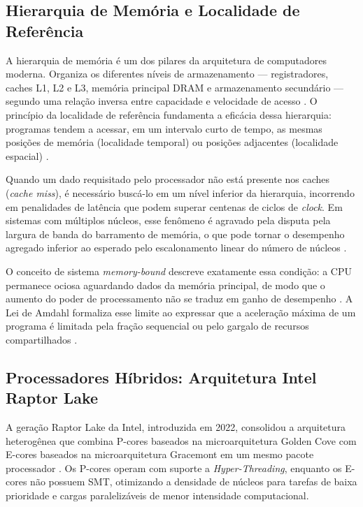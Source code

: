 \documentclass[12pt]{article}
\begin{document}
\subsection{Hierarquia de Memória e Localidade de Referência}

A hierarquia de memória é um dos pilares da arquitetura de computadores moderna. Organiza os diferentes níveis de armazenamento --- registradores, caches L1, L2 e L3, memória principal DRAM e armazenamento secundário --- segundo uma relação inversa entre capacidade e velocidade de acesso \cite{patterson2021}. O princípio da localidade de referência fundamenta a eficácia dessa hierarquia: programas tendem a acessar, em um intervalo curto de tempo, as mesmas posições de memória (localidade temporal) ou posições adjacentes (localidade espacial) \cite{hennessy2017}.

Quando um dado requisitado pelo processador não está presente nos caches (\textit{cache miss}), é necessário buscá-lo em um nível inferior da hierarquia, incorrendo em penalidades de latência que podem superar centenas de ciclos de \textit{clock}. Em sistemas com múltiplos núcleos, esse fenômeno é agravado pela disputa pela largura de banda do barramento de memória, o que pode tornar o desempenho agregado inferior ao esperado pelo escalonamento linear do número de núcleos \cite{mccalpin1995,rogers2009bandwidth,diamond2011evaluation}.

O conceito de sistema \textit{memory-bound} descreve exatamente essa condição: a CPU permanece ociosa aguardando dados da memória principal, de modo que o aumento do poder de processamento não se traduz em ganho de desempenho \cite{williams2009}. A Lei de Amdahl formaliza esse limite ao expressar que a aceleração máxima de um programa é limitada pela fração sequencial ou pelo gargalo de recursos compartilhados \cite{amdahl1967}.

\subsection{Processadores Híbridos: Arquitetura Intel Raptor Lake}

A geração Raptor Lake da Intel, introduzida em 2022, consolidou a arquitetura heterogênea que combina P-cores baseados na microarquitetura Golden Cove com E-cores baseados na microarquitetura Gracemont em um mesmo pacote processador \cite{intel2021hybrid,intel2022raptorlake}. Os P-cores operam com suporte a \textit{Hyper-Threading}, enquanto os E-cores não possuem SMT, otimizando a densidade de núcleos para tarefas de baixa prioridade e cargas paralelizáveis de menor intensidade computacional.
\end{document}
